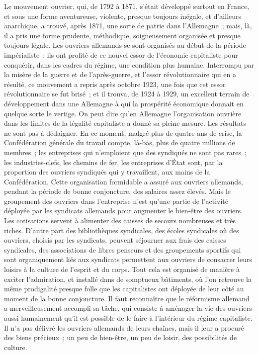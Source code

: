 \documentclass[french,twoside]{book} %
\begin{document}
Le mouvement ouvrier, qui, de 1792 à 1871, s'était développé surtout en France, et sous une forme aventureuse, violente, presque toujours inégale, et d'ailleurs anarchique, a trouvé, après 1871, une sorte de patrie dans l'Allema­gne ; mais, là, il a pris une forme prudente, méthodique, soigneuse­ment organisée et presque toujours légale. Les ouvriers allemands se sont organisés au début de la période impérialiste ; ils ont profité de ce nouvel essor de l'économie capitaliste pour conquérir, dans les cadres du régime, une condi­tion plus humaine. Interrompu par la misère de la guerre et de l'après-guerre, et l'essor révolutionnaire qui en a résulté, ce mouvement a repris après octobre 1923, une fois que cet essor révolutionnaire se fut brisé ; et il trouva, de 1924 à 1929, un excellent terrain de développement dans une Allemagne à qui la prospérité économique donnait en quelque sorte le vertige. On peut dire qu'en Allemagne l'organisation ouvrière dans les limites de la légalité capitaliste a donné sa pleine mesure. Les résultats ne sont pas à dédaigner. En ce moment, malgré plus de quatre ans de crise, la Confédération générale du travail compte, là-bas, plus de quatre millions de membres ; les entreprises qui n'em­ploient que des syndiqués ne sont pas rares ; les industries-clefs, les chemins de fer, les entreprises d'État sont, par la proportion des ouvriers syndiqués qui y travaillent, aux mains de la Confédération. Cette organisation formidable a assuré aux ouvriers allemands, pendant la période de bonne conjoncture, des salaires assez élevés. Mais le groupement des ouvriers dans l'entreprise n'est qu'une partie de l'activité déployée par les syndicats allemands pour augmen­ter le bien-être des ouvriers. Les cotisations servent à alimenter des caisses de secours nombreuses et très riches. D'autre part des bibliothèques syndicales, des écoles syndicales où des ouvriers, choisis par les syndicats, peuvent séjourner aux frais des caisses syndicales, des associations de libres penseurs et des groupements sportifs qui sont organiquement liés aux syndicats permettent aux ouvriers de consacrer leurs loisirs à la culture de l'esprit et du corps. Tout cela est organisé de manière à exciter l'admiration, et installé dans de somptueux bâtiments, où l'on retrouve la même prodigalité presque folle que les capitalistes ont déployée de leur côté au moment de la bonne conjonc­ture. Il faut reconnaître que le réformisme allemand a merveilleusement accompli sa tâche, qui consiste à aménager la vie des ouvriers aussi humai­nement qu'il est possible de le faire à l'intérieur du régime capitaliste. Il n'a pas délivré les ouvriers allemands de leurs chaînes, mais il leur a procuré des biens précieux ; un peu de bien-être, un peu de loisir, des possibilités de culture.\par
\end{document}
